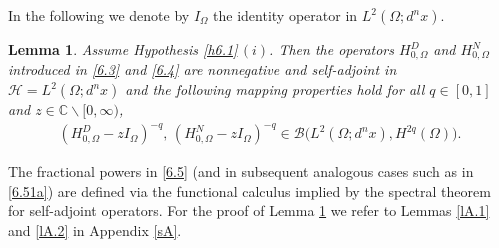 \documentclass[reqno,10pt, centertags]{amsart}
\newcommand{\bbR}{{\mathbb{R}}}
\newcommand{\bbC}{{\mathbb{C}}}
\newcommand{\cB}{{\mathcal B}}
\newcommand{\cH}{{\mathcal H}}
\newcommand{\lb}{\label}
\newcommand{\Om}{\Omega}
\numberwithin{equation}{section}
\newtheorem{lemma}[theorem]{Lemma}
\theoremstyle{definition}
\begin{document}
In the following we denote by $I_\Om$ the identity operator
in $L^2(\Om;d^nx)$.

\begin{lemma} \lb{l6.1}
Assume Hypothesis \ref{h6.1}\,$(i)$. Then the operators $H_{0,\Om}^D$ and
$H_{0,\Om}^N$ introduced in \eqref{6.3} and \eqref{6.4} are nonnegative
and self-adjoint in $\cH=L^2(\Om;d^nx)$ and the following mapping
properties hold for all %
$q\in [0,1]$ and $z\in\bbC\backslash[0,\infty)$,
\begin{align}
(H_{0,\Om}^D-zI_{\Om})^{-q},\, (H_{0,\Om}^N-zI_{\Om})^{-q}
\in\cB\big(L^2(\Om;d^nx),H^{2q}(\Om)\big). \lb{6.5}
\end{align}
\end{lemma}

The fractional powers in \eqref{6.5} (and in subsequent analogous cases
such as in \eqref{6.51a}) are defined via the functional calculus implied
by the spectral theorem for self-adjoint operators. For the proof of Lemma
\ref{l6.1} we refer to Lemmas \ref{lA.1} and
\ref{lA.2} in Appendix \ref{sA}.
\end{document}
